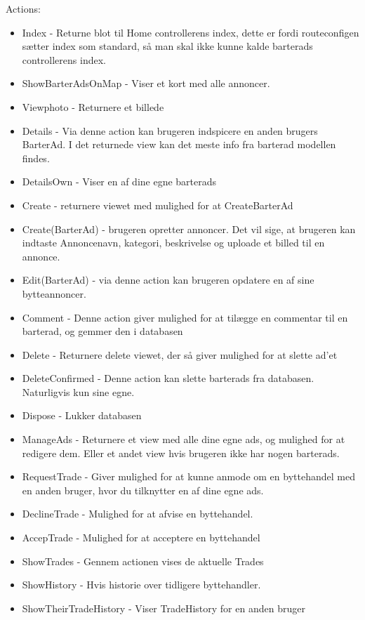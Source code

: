 Actions:
\begin{itemize}
	\item Index - Returne blot til Home controllerens index, dette er fordi routeconfigen sætter index som standard, så man skal ikke kunne kalde barterads controllerens index.
	\item ShowBarterAdsOnMap - Viser et kort med alle annoncer.
	\item Viewphoto - Returnere et billede
	\item Details - Via denne action kan brugeren indspicere en anden brugers  BarterAd. I det returnede view kan det meste info fra barterad modellen findes.
	\item DetailsOwn - Viser en af dine egne barterads
	\item Create - returnere viewet med mulighed for at CreateBarterAd
	\item Create(BarterAd) - brugeren opretter annoncer. Det vil sige, at brugeren kan indtaste Annoncenavn, kategori, beskrivelse og uploade et billed til en annonce. 
	\item Edit(BarterAd) - via denne action kan brugeren opdatere en af sine bytteannoncer.
	\item Comment - Denne action giver mulighed for at tilægge en commentar til en barterad, og gemmer den i databasen
	\item Delete - Returnere delete viewet, der så giver mulighed for at slette ad'et 
	\item DeleteConfirmed - Denne action kan slette barterads fra databasen. Naturligvis kun sine egne. 
	\item Dispose - Lukker databasen
	\item ManageAds - Returnere et view med alle dine egne ads, og mulighed for at redigere dem. Eller et andet view hvis brugeren ikke har nogen barterads. 
	\item RequestTrade - Giver mulighed for at kunne anmode om en byttehandel med en anden bruger, hvor du tilknytter en af dine egne ads.
	\item DeclineTrade - Mulighed for at afvise en byttehandel. 
	\item AccepTrade - Mulighed for at acceptere en byttehandel
	\item ShowTrades - Gennem actionen vises de aktuelle Trades
	\item ShowHistory - Hvis historie over tidligere byttehandler.
	\item ShowTheirTradeHistory - Viser TradeHistory for en anden bruger
	

\end{itemize}
